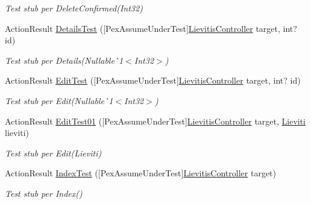 \begin{DoxyCompactItemize}
\begin{DoxyCompactList}\small\item\em Test stub per Delete\+Confirmed(\+Int32)\end{DoxyCompactList}\item 
Action\+Result \mbox{\hyperlink{class_brew_day2_1_1_controllers_1_1_tests_1_1_lievitis_controller_test_a0981b1ca63e1c7cef09eafefcf1d24c4}{Details\+Test}} (\mbox{[}Pex\+Assume\+Under\+Test\mbox{]}\mbox{\hyperlink{class_brew_day2_1_1_controllers_1_1_lievitis_controller}{Lievitis\+Controller}} target, int? id)
\begin{DoxyCompactList}\small\item\em Test stub per Details(Nullable\`{}1$<$Int32$>$)\end{DoxyCompactList}\item 
Action\+Result \mbox{\hyperlink{class_brew_day2_1_1_controllers_1_1_tests_1_1_lievitis_controller_test_a136d9506ffdff4f40c67c76bb68d1aa7}{Edit\+Test}} (\mbox{[}Pex\+Assume\+Under\+Test\mbox{]}\mbox{\hyperlink{class_brew_day2_1_1_controllers_1_1_lievitis_controller}{Lievitis\+Controller}} target, int? id)
\begin{DoxyCompactList}\small\item\em Test stub per Edit(Nullable\`{}1$<$Int32$>$)\end{DoxyCompactList}\item 
Action\+Result \mbox{\hyperlink{class_brew_day2_1_1_controllers_1_1_tests_1_1_lievitis_controller_test_a293d08f28b0adc7d5bab68ca5395b390}{Edit\+Test01}} (\mbox{[}Pex\+Assume\+Under\+Test\mbox{]}\mbox{\hyperlink{class_brew_day2_1_1_controllers_1_1_lievitis_controller}{Lievitis\+Controller}} target, \mbox{\hyperlink{class_brew_day2_1_1_models_1_1_lieviti}{Lieviti}} lieviti)
\begin{DoxyCompactList}\small\item\em Test stub per Edit(\+Lieviti)\end{DoxyCompactList}\item 
Action\+Result \mbox{\hyperlink{class_brew_day2_1_1_controllers_1_1_tests_1_1_lievitis_controller_test_ac77932c26b8f4edc8774ef8545fad7d4}{Index\+Test}} (\mbox{[}Pex\+Assume\+Under\+Test\mbox{]}\mbox{\hyperlink{class_brew_day2_1_1_controllers_1_1_lievitis_controller}{Lievitis\+Controller}} target)
\begin{DoxyCompactList}\small\item\em Test stub per Index()\end{DoxyCompactList}\end{DoxyCompactItemize}


